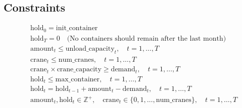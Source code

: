\documentclass{article}
\begin{document}
\subsection*{Constraints}
\begin{align*}
    & \text{hold}_0 = \text{init\_container} \\
    & \text{hold}_T = 0 \quad \text{(No containers should remain after the last month)} \\
    & \text{amount}_t \leq \text{unload\_capacity}_t, \quad t = 1, \ldots, T \\
    & \text{crane}_t \leq \text{num\_cranes}, \quad t = 1, \ldots, T \\
    & \text{crane}_t \times \text{crane\_capacity} \geq \text{demand}_t, \quad t = 1, \ldots, T \\
    & \text{hold}_t \leq \text{max\_container}, \quad t = 1, \ldots, T \\
    & \text{hold}_t = \text{hold}_{t-1} + \text{amount}_t - \text{demand}_t, \quad t = 1, \ldots, T \\
    & \text{amount}_t, \text{hold}_t \in \mathbb{Z}^+, \quad \text{crane}_t \in \{0, 1, \ldots, \text{num\_cranes}\}, \quad t = 1, \ldots, T
\end{align*}
\end{document}
